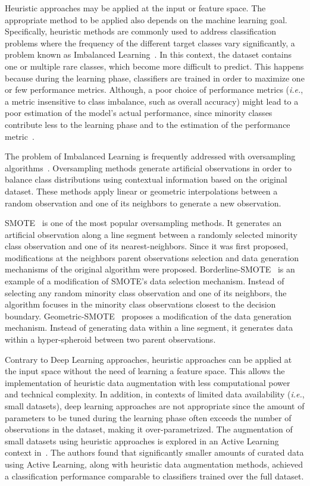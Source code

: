 \documentclass[parskip=full]{scrartcl}
\begin{document}
Heuristic approaches may be applied at the input or feature space. The
appropriate method to be applied also depends on the machine learning goal.
Specifically, heuristic methods are commonly used to address classification
problems where the frequency of the different target classes vary
significantly, a problem known as Imbalanced Learning~\cite{Chawla2004}. In
this context, the dataset contains one or multiple rare classes, which become
more difficult to predict. This happens because during the learning phase,
classifiers are trained in order to maximize one or few performance metrics.
Although, a poor choice of performance metrics (\textit{i.e.}, a metric
insensitive to class imbalance, such as overall accuracy) might lead to a poor
estimation of the model's actual performance, since minority classes
contribute less to the learning phase and to the estimation of the performance
metric~\cite{Fonseca2021}. 

The problem of Imbalanced Learning is frequently addressed with oversampling
algorithms~\cite{Kaur2019}. Oversampling methods generate artificial
observations in order to balance class distributions using contextual
information based on the original dataset. These methods apply linear or
geometric interpolations between a random observation and one of its neighbors
to generate a new observation.

SMOTE~\cite{Chawla2002} is one of the most popular oversampling methods. It
generates an artificial observation along a line segment between a randomly
selected minority class observation and one of its nearest-neighbors. Since it
was first proposed, modifications at the neighbors parent observations
selection and data generation mechanisms of the original algorithm were
proposed. Borderline-SMOTE~\cite{Han2005} is an example of a modification of
SMOTE's data selection mechanism. Instead of selecting any random minority
class observation and one of its neighbors, the algorithm focuses in the
minority class observations closest to the decision boundary.
Geometric-SMOTE~\cite{Douzas2019} proposes a modification of the data
generation mechanism. Instead of generating data within a line segment, it
generates data within a hyper-spheroid between two parent observations.

Contrary to Deep Learning approaches, heuristic approaches can be applied at
the input space without the need of learning a feature space. This allows the
implementation of heuristic data augmentation with less computational power
and technical complexity. In addition, in contexts of limited data
availability (\textit{i.e.}, small datasets), deep learning approaches are not
appropriate since the amount of parameters to be tuned during the learning
phase often exceeds the number of observations in the dataset, making it
over-parametrized. The augmentation of small datasets using heuristic
approaches is explored in an Active Learning context
in~\cite{Fonseca2021active}. The authors found that significantly smaller
amounts of curated data using Active Learning, along with heuristic data
augmentation methods, achieved a classification performance comparable to
classifiers trained over the full dataset.
\end{document}
